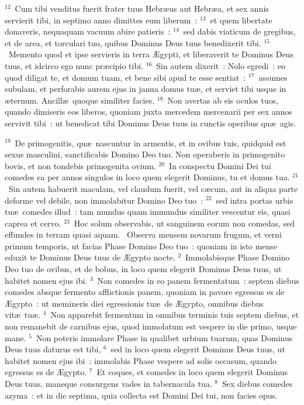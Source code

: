 ${}^{12}$~Cum tibi venditus fuerit frater tuus Hebr\ae us aut Hebr\ae a, et sex annis servierit tibi, in septimo anno dimittes eum liberum~:
${}^{13}$~et quem libertate donaveris, nequaquam vacuum abire patieris~:
${}^{14}$~sed dabis viaticum de gregibus, et de area, et torculari tuo, quibus Dominus Deus tuus benedixerit tibi.
${}^{15}$~Memento quod et ipse servieris in terra \AE gypti, et liberaverit te Dominus Deus tuus, et idcirco ego nunc pr\ae cipio tibi.
${}^{16}$~Sin autem dixerit~: Nolo egredi~: eo quod diligat te, et domum tuam, et bene sibi apud te esse sentiat~:
${}^{17}$~assumes subulam, et perforabis aurem ejus in janua domus tu\ae , et serviet tibi usque in \ae ternum. Ancill\ae\ quoque similiter facies.
${}^{18}$~Non avertas ab eis oculos tuos, quando dimiseris eos liberos, quoniam juxta mercedem mercenarii per sex annos servivit tibi~: ut benedicat tibi Dominus Deus tuus in cunctis operibus qu\ae\ agis.


${}^{19}$~De primogenitis, qu\ae\ nascuntur in armentis, et in ovibus tuis, quidquid est sexus masculini, sanctificabis Domino Deo tuo. Non operaberis in primogenito bovis, et non tondebis primogenita ovium.
${}^{20}$~In conspectu Domini Dei tui comedes ea per annos singulos in loco quem elegerit Dominus, tu et domus tua.
${}^{21}$~Sin autem habuerit maculam, vel claudum fuerit, vel c\ae cum, aut in aliqua parte deforme vel debile, non immolabitur Domino Deo tuo~:
${}^{22}$~sed intra portas urbis tu\ae\ comedes illud~: tam mundus quam immundus similiter vescentur eis, quasi caprea et cervo.
${}^{23}$~Hoc solum observabis, ut sanguinem eorum non comedas, sed effundes in terram quasi aquam.
~\lettrine[lines=10,image=true,loversize=0.05,lraise=-0.03]{O}{}bserva mensem novarum frugum, et verni primum temporis, ut facias Phase Domino Deo tuo~: quoniam in isto mense eduxit te Dominus Deus tuus de \AE gypto nocte.
${}^{2}$~Immolabisque Phase Domino Deo tuo de ovibus, et de bobus, in loco quem elegerit Dominus Deus tuus, ut habitet nomen ejus ibi.
${}^{3}$~Non comedes in eo panem fermentatum~: septem diebus comedes absque fermento afflictionis panem, quoniam in pavore egressus es de \AE gypto~: ut memineris diei egressionis tu\ae\ de \AE gypto, omnibus diebus vit\ae\ tu\ae .
${}^{4}$~Non apparebit fermentum in omnibus terminis tuis septem diebus, et non remanebit de carnibus ejus, quod immolatum est vespere in die primo, usque mane.
${}^{5}$~Non poteris immolare Phase in qualibet urbium tuarum, quas Dominus Deus tuus daturus est tibi,
${}^{6}$~sed in loco quem elegerit Dominus Deus tuus, ut habitet nomen ejus ibi~: immolabis Phase vespere ad solis occasum, quando egressus es de \AE gypto.
${}^{7}$~Et coques, et comedes in loco quem elegerit Dominus Deus tuus, maneque consurgens vades in tabernacula tua.
${}^{8}$~Sex diebus comedes azyma~: et in die septima, quia collecta est Domini Dei tui, non facies opus.



